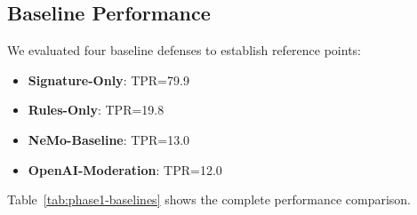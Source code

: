 
\subsection{Baseline Performance}

We evaluated four baseline defenses to establish reference points:
\begin{itemize}
  \item \textbf{Signature-Only}: TPR=79.9%
  \item \textbf{Rules-Only}: TPR=19.8%
  \item \textbf{NeMo-Baseline}: TPR=13.0%
  \item \textbf{OpenAI-Moderation}: TPR=12.0%
\end{itemize}

Table~\ref{tab:phase1-baselines} shows the complete performance comparison.